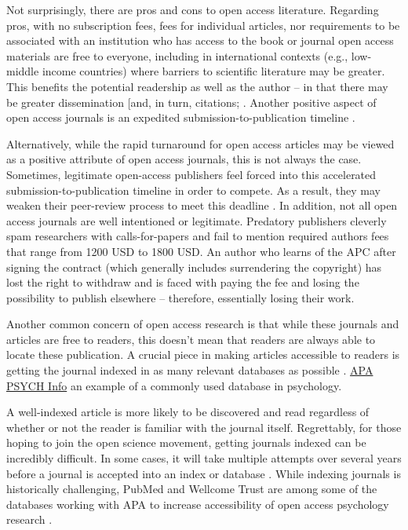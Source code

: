 \documentclass[
  11pt,
]{book}
\begin{document}
Not surprisingly, there are pros and cons to open access literature. Regarding pros, with no subscription fees, fees for individual articles, nor requirements to be associated with an institution who has access to the book or journal \citep{bezjak_open_2018, shah_open_2017} open access materials are free to everyone, including in international contexts (e.g., low-middle income countries) where barriers to scientific literature may be greater. This benefits the potential readership as well as the author -- in that there may be greater dissemination {[}and, in turn, citations; \citep{hagger_developing_2022}. Another positive aspect of open access journals is an expedited submission-to-publication timeline \citep{shah_open_2017}.

Alternatively, while the rapid turnaround for open access articles may be viewed as a positive attribute of open access journals, this is not always the case. Sometimes, legitimate open-access publishers feel forced into this accelerated submission-to-publication timeline in order to compete. As a result, they may weaken their peer-review process to meet this deadline \citep{beall_predatory_2012}. In addition, not all open access journals are well intentioned or legitimate. Predatory publishers cleverly spam researchers with calls-for-papers and fail to mention required authors fees that range from 1200 USD to 1800 USD. An author who learns of the APC after signing the contract (which generally includes surrendering the copyright) has lost the right to withdraw and is faced with paying the fee and losing the possibility to publish elsewhere -- therefore, essentially losing their work.

Another common concern of open access research is that while these journals and articles are free to readers, this doesn't mean that readers are always able to locate these publication. A crucial piece in making articles accessible to readers is getting the journal indexed in as many relevant databases as possible \citep{fortney_getting_2016}. \href{https://www.apa.org/pubs/databases/psycinfois}{APA PSYCH Info} an example of a commonly used database in psychology.

A well-indexed article is more likely to be discovered and read regardless of whether or not the reader is familiar with the journal itself. Regrettably, for those hoping to join the open science movement, getting journals indexed can be incredibly difficult. In some cases, it will take multiple attempts over several years before a journal is accepted into an index or database \citep{fortney_getting_2016, shah_open_2017}. While indexing journals is historically challenging, PubMed and Wellcome Trust are among some of the databases working with APA to increase accessibility of open access psychology research \citep{martone_data_2018}.
\end{document}
